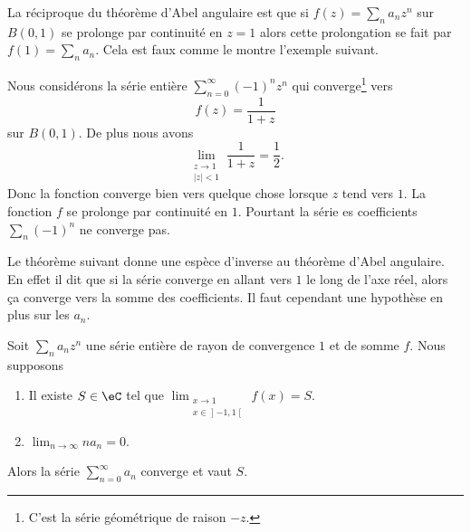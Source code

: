 La réciproque du théorème d'Abel angulaire est que si \( f(z)=\sum_na_nz^n\) sur \( B(0,1)\) se prolonge par continuité en \( z=1\) alors cette prolongation se fait par \( f(1)=\sum_na_n\). Cela est faux comme le montre l'exemple suivant.

\begin{example}
    Nous considérons la série entière \( \sum_{n=0}^{\infty}(-1)^nz^n\) qui converge\footnote{C'est la série géométrique de raison \( -z\).} vers
    \begin{equation}
        f(z)=\frac{1}{ 1+z }
    \end{equation}
    sur \( B(0,1)\). De plus nous avons
    \begin{equation}
        \lim_{\substack{z\to 1\\    | z |<1}}\frac{1}{ 1+z }=\frac{ 1 }{2}.
    \end{equation}
    Donc la fonction converge bien vers quelque chose lorsque \( z\) tend vers \( 1\). La fonction \( f\) se prolonge par continuité en \( 1\). Pourtant la série es coefficients \( \sum_n(-1)^n\) ne converge pas.
\end{example}

Le théorème suivant donne une espèce d'inverse au théorème d'Abel angulaire. En effet il dit que si la série converge  en allant vers \( 1\) le long de l'axe réel, alors ça converge vers la somme des coefficients. Il faut cependant une hypothèse en plus sur les \( a_n\).
\begin{theorem}
    Soit \( \sum_na_nz^n\) une série entière de rayon de convergence \( 1\) et de somme \( f\). Nous supposons
    \begin{enumerate}
        \item
            Il existe \( S\in \eC\) tel que \( \lim_{\substack{x\to 1\\x\in\mathopen] -1 , 1 \mathclose[}}f(x)=S\).
            \item
                \( \lim_{n\to \infty} na_n=0\).
    \end{enumerate}
    Alors la série \( \sum_{n=0}^{\infty}a_n\) converge et vaut \( S\).
\end{theorem}

